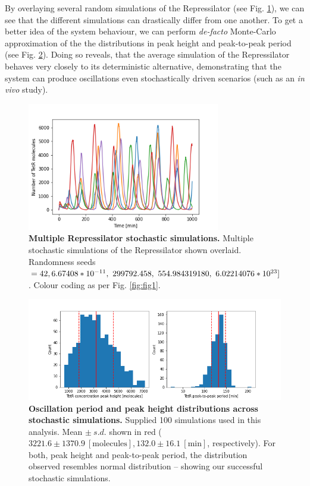\documentclass[runningheads,a4paper]{llncs}
\begin{document}
By overlaying several random simulations of the Repressilator (see Fig. \ref{fig:fig18}), we can see that  the different simulations can drastically differ from one another. To get a better idea of the system behaviour, we can perform \textit{de-facto} Monte-Carlo approximation of the the distributions in peak height and peak-to-peak period (see Fig. \ref{fig:fig19}). Doing so reveals, that the average simulation of the Repressilator behaves very closely to its deterministic alternative, demonstrating that the system can produce oscillations even stochastically driven scenarios (such as an \textit{in vivo} study).

\begin{figure}
    \singlespacing
    \centering
    \includegraphics[width=0.75\textwidth]{suplementary_information_and_code/Task6_figure2.png}
    \caption{\textbf{Multiple Repressilator stochastic simulations.} Multiple stochastic simulations of the Repressilator shown overlaid. Randomness seeds $= 42,\linebreak 6.67408*10^{-11},\ 299792.458,\ 554.984319180,\ 6.02214076*10^{23}]$. Colour coding as per Fig. \ref{fig:fig1}.}
    \label{fig:fig18}
\end{figure}

\begin{figure}
    \singlespacing
    \centering
    \includegraphics[width=1\textwidth,trim={1.5cm 0 1.5cm 0},clip]{suplementary_information_and_code/Task6_figure3.png}
    \caption{\textbf{Oscillation period and peak height distributions across stochastic simulations.} Supplied 100 simulations used in this analysis. Mean $\pm\ s.d.$ shown in red ($3221.6 \pm 1370.9\ [\textrm{molecules}], 132.0 \pm 16.1\ [\textrm{min}]$, respectively). For both, peak height and peak-to-peak period, the distribution observed resembles normal distribution -- showing our successful stochastic simulations.}
    \label{fig:fig19}
\end{figure}
\end{document}
